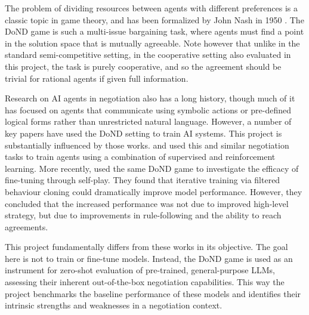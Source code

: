 The problem of dividing resources between agents with different preferences is a classic topic in game theory, and has been formalized by John Nash in 1950 \cite{nash1950equilibrium,nash1950bargaining}. The DoND game is such a multi-issue bargaining task, where agents must find a point in the solution space that is mutually agreeable. Note however that unlike in the standard semi-competitive setting, in the cooperative setting also evaluated in this project, the task is purely cooperative, and so the agreement should be trivial for rational agents if given full information.

Research on AI agents in negotiation also has a long history, though much of it has focused on agents that communicate using symbolic actions or pre-defined logical forms rather than unrestricted natural language. However, a number of key papers have used the DoND setting to train AI systems. This project is substantially influenced by those works. \cite{lewis2017deal} and \cite{he2018decoupling} used this and similar negotiation tasks to train agents using a combination of supervised and reinforcement learning. More recently, \cite{liao2024efficacy} used the same DoND game to investigate the efficacy of fine-tuning through self-play. They found that iterative training via filtered behaviour cloning could dramatically improve model performance. However, they concluded that the increased performance was not due to improved high-level strategy, but due to improvements in rule-following and the ability to reach agreements.

This project fundamentally differs from these works in its objective. The goal here is not to train or fine-tune models. Instead, the DoND game is used as an instrument for zero-shot evaluation of pre-trained, general-purpose LLMs, assessing their inherent out-of-the-box negotiation capabilities. This way the project benchmarks the baseline performance of these models and identifies their intrinsic strengths and weaknesses in a negotiation context.
